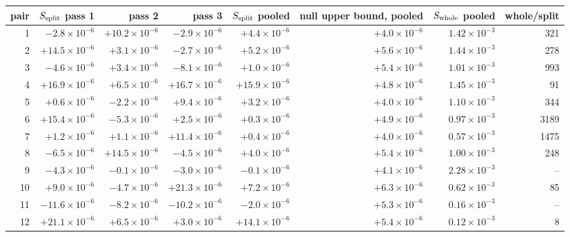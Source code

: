 \documentclass[11pt,a4paper]{article}
\begin{document}
\begin{center}\scriptsize
\begin{tabular}{@{}rrrrrrrr@{}}
\toprule
pair & $S_{\rm split}$ pass 1 & pass 2 & pass 3 & $S_{\rm split}$ pooled & null upper bound, pooled & $S_{\rm whole}$ pooled & whole/split \\
\midrule
1 & $-2.8\times10^{-6}$ & $+10.2\times10^{-6}$ & $-2.9\times10^{-6}$ & $+4.4\times10^{-6}$ & $+4.0\times10^{-6}$ & $1.42\times10^{-3}$ & 321 \\
2 & $+14.5\times10^{-6}$ & $+3.1\times10^{-6}$ & $-2.7\times10^{-6}$ & $+5.2\times10^{-6}$ & $+5.6\times10^{-6}$ & $1.44\times10^{-3}$ & 278 \\
3 & $-4.6\times10^{-6}$ & $+3.4\times10^{-6}$ & $-8.1\times10^{-6}$ & $+1.0\times10^{-6}$ & $+5.4\times10^{-6}$ & $1.01\times10^{-3}$ & 993 \\
4 & $+16.9\times10^{-6}$ & $+6.5\times10^{-6}$ & $+16.7\times10^{-6}$ & $+15.9\times10^{-6}$ & $+4.8\times10^{-6}$ & $1.45\times10^{-3}$ & 91 \\
5 & $+0.6\times10^{-6}$ & $-2.2\times10^{-6}$ & $+9.4\times10^{-6}$ & $+3.2\times10^{-6}$ & $+4.0\times10^{-6}$ & $1.10\times10^{-3}$ & 344 \\
6 & $+15.4\times10^{-6}$ & $-5.3\times10^{-6}$ & $+2.5\times10^{-6}$ & $+0.3\times10^{-6}$ & $+4.9\times10^{-6}$ & $0.97\times10^{-3}$ & 3189 \\
7 & $+1.2\times10^{-6}$ & $+1.1\times10^{-6}$ & $+11.4\times10^{-6}$ & $+0.4\times10^{-6}$ & $+4.0\times10^{-6}$ & $0.57\times10^{-3}$ & 1475 \\
8 & $-6.5\times10^{-6}$ & $+14.5\times10^{-6}$ & $-4.5\times10^{-6}$ & $+4.0\times10^{-6}$ & $+5.4\times10^{-6}$ & $1.00\times10^{-3}$ & 248 \\
9 & $-4.3\times10^{-6}$ & $-0.1\times10^{-6}$ & $-3.0\times10^{-6}$ & $-0.1\times10^{-6}$ & $+4.1\times10^{-6}$ & $2.28\times10^{-3}$ & -- \\
10 & $+9.0\times10^{-6}$ & $-4.7\times10^{-6}$ & $+21.3\times10^{-6}$ & $+7.2\times10^{-6}$ & $+6.3\times10^{-6}$ & $0.62\times10^{-3}$ & 85 \\
11 & $-11.6\times10^{-6}$ & $-8.2\times10^{-6}$ & $-10.2\times10^{-6}$ & $-2.0\times10^{-6}$ & $+5.3\times10^{-6}$ & $0.16\times10^{-3}$ & -- \\
12 & $+21.1\times10^{-6}$ & $+6.5\times10^{-6}$ & $+3.0\times10^{-6}$ & $+14.1\times10^{-6}$ & $+5.4\times10^{-6}$ & $0.12\times10^{-3}$ & 8 \\
\bottomrule
\end{tabular}
\end{center}
\end{document}
